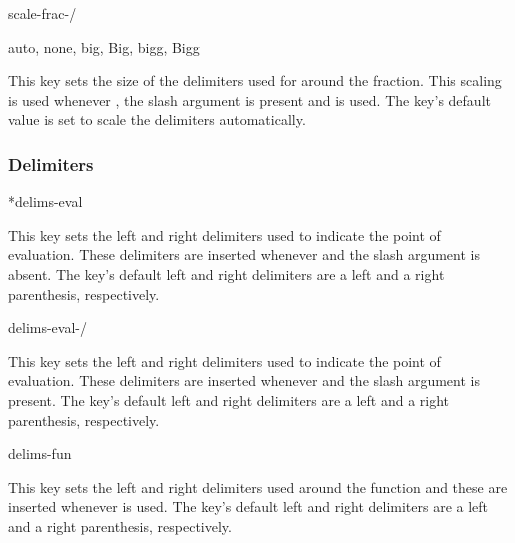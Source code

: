 	\begin{option}{scale-frac-/}
		\begin{values}[default = auto]
			auto, none, big, Big, bigg, Bigg
		\end{values}
		This key sets the size of the delimiters used for around the fraction. This scaling is used whenever , the slash argument is present and  is used. The key's default value is set to scale the delimiters automatically.
	\end{option}
	
	\subsubsection*{Delimiters}
	
	\begin{option}*{delims-eval}
		\begin{values}[default = .~\cs{rvert}]
		\end{values}
		This key sets the left and right delimiters used to indicate the point of evaluation. These delimiters are inserted whenever  and the slash argument is absent. The key's default left and right delimiters are a left and a right parenthesis, respectively.
	\end{option}
	
	\begin{option}{delims-eval-/}
		\begin{values}[default = .~\cs{rvert}]
		\end{values}
		This key sets the left and right delimiters used to indicate the point of evaluation. These delimiters are inserted whenever  and the slash argument is present. The key's default left and right delimiters are a left and a right parenthesis, respectively.
	\end{option}
	
	\begin{option}{delims-fun}
		\begin{values}[default = (~)]
		\end{values}
		This key sets the left and right delimiters used around the function and these are inserted whenever  is used. The key's default left and right delimiters are a left and a right parenthesis, respectively.
	\end{option}
	
